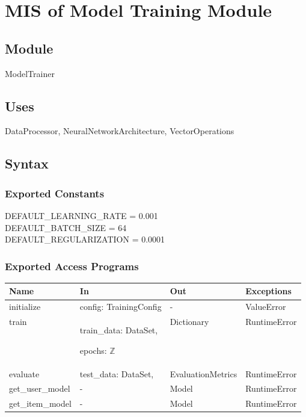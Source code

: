 \documentclass[12pt, titlepage]{article}
\begin{document}
\newpage

\section{MIS of Model Training Module} \label{ModuleMT}

\subsection{Module}

ModelTrainer

\subsection{Uses}
DataProcessor, NeuralNetworkArchitecture, VectorOperations

\subsection{Syntax}

\subsubsection{Exported Constants}
DEFAULT\_LEARNING\_RATE = 0.001\\
DEFAULT\_BATCH\_SIZE = 64\\
DEFAULT\_REGULARIZATION = 0.0001
\subsubsection{Exported Access Programs}

\begin{center}
  \begin{tabular}{p{3cm} p{4cm} p{4cm} p{2cm}}
  \hline
  \textbf{Name} & \textbf{In} & \textbf{Out} & \textbf{Exceptions} \\
  \hline
  initialize & config: TrainingConfig & - & ValueError \\
  \hline
  train & train\_data: DataSet,
  
  epochs: $\mathbb{Z}$
  
  & Dictionary & RuntimeError \\
  \hline
  evaluate & test\_data: DataSet,
  
  & EvaluationMetrics & RuntimeError \\
  \hline
  get\_user\_model & 
  
  - &  Model & RuntimeError \\
  \hline
  get\_item\_model & 
  
  - &  Model & RuntimeError \\
  \hline
  \end{tabular}
  \end{center}
\end{document}
